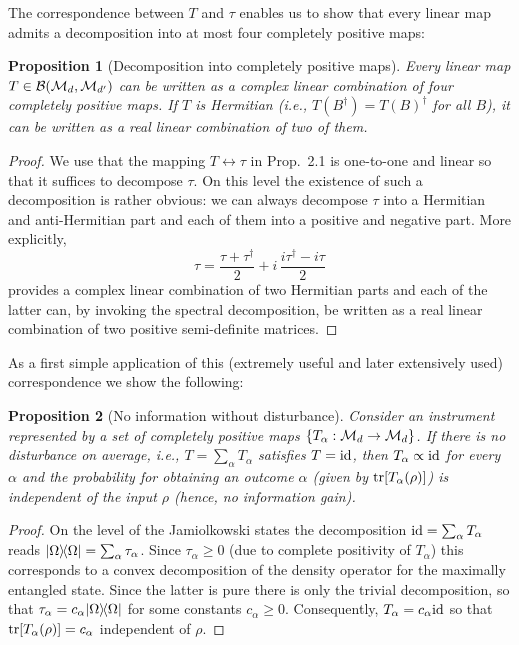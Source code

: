 \documentclass[11pt,a4paper]{article}
\numberwithin{equation}{section}
\theoremstyle{plain}
\newtheorem{proposition}{Proposition}[section]
\theoremstyle{definition}
\begin{document}
The correspondence between $T$ and $\tau$ enables us to show that every linear map
admits a decomposition into at most four completely positive maps:

\begin{proposition}[Decomposition into completely positive maps]
    Every linear map $T \in \mathcal{B}(\mathcal{M}_d,\mathcal{M}_{d'})$ can be written as a complex linear
    combination of four completely positive maps. If $T$ is Hermitian (i.e.,
    $T(B^\dagger)=T(B)^\dagger$ for all $B$), it can be written as a real linear
    combination of two of them.
\end{proposition}

\begin{proof}
    We use that the mapping $T \leftrightarrow \tau$ in Prop.~2.1 is one-to-one and
    linear so that it suffices to decompose $\tau$. On this level the existence of such
    a decomposition is rather obvious: we can always decompose $\tau$ into a Hermitian
    and anti-Hermitian part and each of them into a positive and negative part. More
    explicitly,
    \[
        \tau = \frac{\tau+\tau^\dagger}{2} + i\,\frac{i\tau^\dagger - i\tau}{2}
    \]
    provides a complex linear combination of two Hermitian parts and each of the latter
    can, by invoking the spectral decomposition, be written as a real linear combination
    of two positive semi-definite matrices.
\end{proof}

As a first simple application of this (extremely useful and later extensively used)
correspondence we show the following:

\begin{proposition}[No information without disturbance]
    Consider an instrument represented by a set of completely positive maps
    $\{T_\alpha:\mathcal{M}_d \to \mathcal{M}_d\}$. If there is no disturbance on average, i.e.,
    $T=\sum_\alpha T_\alpha$ satisfies $T=\mathrm{id}$, then $T_\alpha \propto \mathrm{id}$ for every
    $\alpha$ and the probability for obtaining an outcome $\alpha$ (given by
    $\operatorname{tr}[T_\alpha(\rho)]$) is independent of the input $\rho$ (hence, no information gain).
\end{proposition}

\begin{proof}
    On the level of the Jamiolkowski states the decomposition $\mathrm{id}=\sum_\alpha T_\alpha$
    reads $|\Omega\rangle\!\langle\Omega|=\sum_\alpha \tau_\alpha$. Since $\tau_\alpha \ge 0$
    (due to complete positivity of $T_\alpha$) this corresponds to a convex decomposition
    of the density operator for the maximally entangled state. Since the latter is pure
    there is only the trivial decomposition, so that $\tau_\alpha = c_\alpha|\Omega\rangle\!\langle\Omega|$
    for some constants $c_\alpha \ge 0$. Consequently, $T_\alpha = c_\alpha\mathrm{id}$ so
    that $\operatorname{tr}[T_\alpha(\rho)] = c_\alpha$ independent of $\rho$.
\end{proof}
\end{document}
